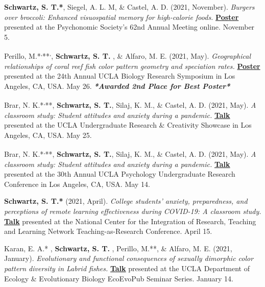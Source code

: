 \pubspace

\textbf{Schwartz, S. T.*}, Siegel, A. L. M, \& Castel, A. D. (2021, November). \textit{Burgers over broccoli: Enhanced visuospatial memory for high-calorie foods.} \textbf{\underline{Poster}} presented at the Psychonomic Society's 62nd Annual Meeting online. November 5.

\pubspace

Perillo, M.*\textsuperscript{,}**\textsuperscript{,}\dag, \textbf{Schwartz, S. T. \dag}, \& Alfaro, M. E. (2021, May). \textit{Geographical relationships of coral reef fish color pattern geometry and speciation rates.} \textbf{\underline{Poster}} presented at the 24th Annual UCLA Biology Research Symposium in Los Angeles, CA, USA. May 26. \textbf{\textit{*Awarded 2nd Place for Best Poster*}}

\pubspace

Brar, N. K.*\textsuperscript{,}**, \textbf{Schwartz, S. T.}, Silaj, K. M., \& Castel, A. D. (2021, May). \textit{A classroom study: Student attitudes and anxiety during a pandemic.} \textbf{\underline{Talk}} presented at the UCLA Undergraduate Research \& Creativity Showcase in Los Angeles, CA, USA. May 25.

\pubspace

Brar, N. K.*\textsuperscript{,}**, \textbf{Schwartz, S. T.}, Silaj, K. M., \& Castel, A. D. (2021, May). \textit{A classroom study: Student attitudes and anxiety during a pandemic.} \textbf{\underline{Talk}} presented at the 30th Annual UCLA Psychology Undergraduate Research Conference in Los Angeles, CA, USA. May 14.

\pubspace

\textbf{Schwartz, S. T.*} (2021, April). \textit{College students’ anxiety, preparedness, and perceptions of remote learning effectiveness during COVID-19: A classroom study.} \textbf{\underline{Talk}} presented at the National Center for the Integration of Research, Teaching and Learning Network Teaching-as-Research Conference. April 15.

\pubspace

Karan, E. A.* \dag, \textbf{Schwartz, S. T. \dag}, Perillo, M.**, \& Alfaro, M. E. (2021, January). \textit{Evolutionary and functional consequences of sexually dimorphic color pattern diversity in Labrid fishes.} \textbf{\underline{Talk}} presented at the UCLA Department of Ecology \& Evolutionary Biology EcoEvoPub Seminar Series. January 14.

